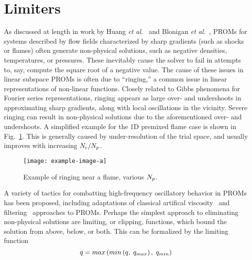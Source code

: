 \section{Limiters}

As discussed at length in work by Huang \textit{et al.}~\cite{Huang2019} and Blonigan \textit{et al.}~\cite{Blonigan2020}, PROMs for systems described by flow fields characterized by sharp gradients (such as shocks or flames) often generate non-physical solutions, such as negative densities, temperatures, or pressures. These inevitably cause the solver to fail in attempts to, say, compute the square root of a negative value. The cause of these issues in linear subspace PROMs is often due to ``ringing,'' a common issue in linear representations of non-linear functions. Closely related to Gibbs phenomena for Fourier series representations, ringing appears as large over- and undershoots in approximating sharp gradients, along with local oscillations in the vicinity. Severe ringing can result in non-physical solutions due to the aforementioned over- and undershoots. A simplified example for the 1D premixed flame case is shown in Fig.~\ref{fig:limitRingingEx}. This is generally caused by under-resolution of the trial space, and usually improves with increasing $N_c/N_p$.

\begin{figure}
    \centering
    \texttt{[image: example-image-a]}
    \caption{\label{fig:limitRingingEx}Example of ringing near a flame, various $N_p$.}
\end{figure}

A variety of tactics for combatting high-frequency oscillatory behavior in PROMs has been proposed, including adaptations of classical artifical viscosity~\cite{Sirisup2004,San2013} and filtering~\cite{Ardag2011,Wells2017} approaches to PROMs. Perhaps the simplest approach to eliminating non-physical solutions are limiting, or clipping, functions, which bound the solution from above, below, or both. This can be formalized by the limiting function 
%
\begin{equation}
    q = max\left(min\left(q, \; q_{max}\right), \; q_{min}\right)
\end{equation}
%


